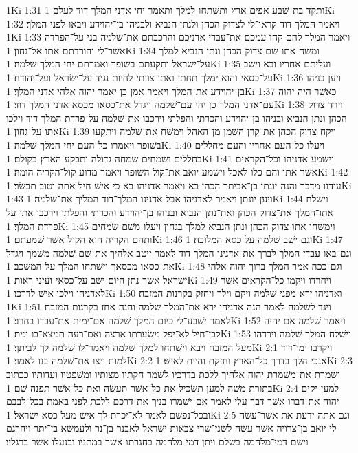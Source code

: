 1Ki 1:31  ותקד בת־שׁבע אפים ארץ ותשׁתחו למלך ותאמר יחי אדני המלך דוד לעלם׃
1Ki 1:32  ויאמר המלך דוד קראו־לי לצדוק הכהן ולנתן הנביא ולבניהו בן־יהוידע ויבאו לפני המלך׃
1Ki 1:33  ויאמר המלך להם קחו עמכם את־עבדי אדניכם והרכבתם את־שׁלמה בני על־הפרדה אשׁר־לי והורדתם אתו אל־גחון׃
1Ki 1:34  ומשׁח אתו שׁם צדוק הכהן ונתן הנביא למלך על־ישׂראל ותקעתם בשׁופר ואמרתם יחי המלך שׁלמה׃
1Ki 1:35  ועליתם אחריו ובא וישׁב על־כסאי והוא ימלך תחתי ואתו צויתי להיות נגיד על־ישׂראל ועל־יהודה׃
1Ki 1:36  ויען בניהו בן־יהוידע את־המלך ויאמר אמן כן יאמר יהוה אלהי אדני המלך׃
1Ki 1:37  כאשׁר היה יהוה עם־אדני המלך כן יהי עם־שׁלמה ויגדל את־כסאו מכסא אדני המלך דוד׃
1Ki 1:38  וירד צדוק הכהן ונתן הנביא ובניהו בן־יהוידע והכרתי והפלתי וירכבו את־שׁלמה על־פרדת המלך דוד וילכו אתו על־גחון׃
1Ki 1:39  ויקח צדוק הכהן את־קרן השׁמן מן־האהל וימשׁח את־שׁלמה ויתקעו בשׁופר ויאמרו כל־העם יחי המלך שׁלמה׃
1Ki 1:40  ויעלו כל־העם אחריו והעם מחללים בחללים ושׂמחים שׂמחה גדולה ותבקע הארץ בקולם׃
1Ki 1:41  וישׁמע אדניהו וכל־הקראים אשׁר אתו והם כלו לאכל וישׁמע יואב את־קול השׁופר ויאמר מדוע קול־הקריה הומה׃
1Ki 1:42  עודנו מדבר והנה יונתן בן־אביתר הכהן בא ויאמר אדניהו בא כי אישׁ חיל אתה וטוב תבשׂר׃
1Ki 1:43  ויען יונתן ויאמר לאדניהו אבל אדנינו המלך־דוד המליך את־שׁלמה׃
1Ki 1:44  וישׁלח אתו־המלך את־צדוק הכהן ואת־נתן הנביא ובניהו בן־יהוידע והכרתי והפלתי וירכבו אתו על פרדת המלך׃
1Ki 1:45  וימשׁחו אתו צדוק הכהן ונתן הנביא למלך בגחון ויעלו משׁם שׂמחים ותהם הקריה הוא הקול אשׁר שׁמעתם׃
1Ki 1:46  וגם ישׁב שׁלמה על כסא המלוכה׃
1Ki 1:47  וגם־באו עבדי המלך לברך את־אדנינו המלך דוד לאמר ייטב אלהיך את־שׁם שׁלמה משׁמך ויגדל את־כסאו מכסאך וישׁתחו המלך על־המשׁכב׃
1Ki 1:48  וגם־ככה אמר המלך ברוך יהוה אלהי ישׂראל אשׁר נתן היום ישׁב על־כסאי ועיני ראות׃
1Ki 1:49  ויחרדו ויקמו כל־הקראים אשׁר לאדניהו וילכו אישׁ לדרכו׃
1Ki 1:50  ואדניהו ירא מפני שׁלמה ויקם וילך ויחזק בקרנות המזבח׃
1Ki 1:51  ויגד לשׁלמה לאמר הנה אדניהו ירא את־המלך שׁלמה והנה אחז בקרנות המזבח לאמר ישׁבע־לי כיום המלך שׁלמה אם־ימית את־עבדו בחרב׃
1Ki 1:52  ויאמר שׁלמה אם יהיה לבן־חיל לא־יפל משׂערתו ארצה ואם־רעה תמצא־בו ומת׃
1Ki 1:53  וישׁלח המלך שׁלמה וירדהו מעל המזבח ויבא וישׁתחו למלך שׁלמה ויאמר־לו שׁלמה לך לביתך׃
1Ki 2:1  ויקרבו ימי־דוד למות ויצו את־שׁלמה בנו לאמר׃
1Ki 2:2  אנכי הלך בדרך כל־הארץ וחזקת והיית לאישׁ׃
1Ki 2:3  ושׁמרת את־משׁמרת יהוה אלהיך ללכת בדרכיו לשׁמר חקתיו מצותיו ומשׁפטיו ועדותיו ככתוב בתורת משׁה למען תשׂכיל את כל־אשׁר תעשׂה ואת כל־אשׁר תפנה שׁם׃
1Ki 2:4  למען יקים יהוה את־דברו אשׁר דבר עלי לאמר אם־ישׁמרו בניך את־דרכם ללכת לפני באמת בכל־לבבם ובכל־נפשׁם לאמר לא־יכרת לך אישׁ מעל כסא ישׂראל׃
1Ki 2:5  וגם אתה ידעת את אשׁר־עשׂה לי יואב בן־צרויה אשׁר עשׂה לשׁני־שׂרי צבאות ישׂראל לאבנר בן־נר ולעמשׂא בן־יתר ויהרגם וישׂם דמי־מלחמה בשׁלם ויתן דמי מלחמה בחגרתו אשׁר במתניו ובנעלו אשׁר ברגליו׃
